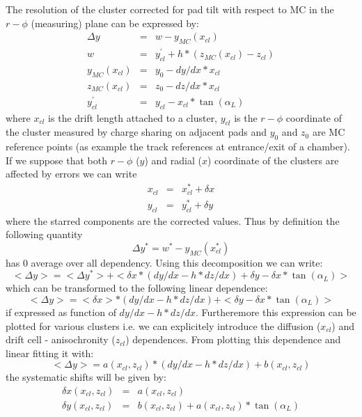 \documentclass{alicetdr}
\begin{document}
The resolution of the cluster corrected for pad tilt with respect to MC in the 
$r-\phi$ (measuring) plane can be expressed by:
\begin{eqnarray}
\Delta y&=&w - y_{MC}(x_{cl})\\
w &=& y_{cl}^{'} + h*(z_{MC}(x_{cl})-z_{cl})\\
y_{MC}(x_{cl}) &=& y_{0} - dy/dx*x_{cl}\\
z_{MC}(x_{cl}) &=& z_{0} - dz/dx*x_{cl}\\
y_{cl}^{'} &=& y_{cl}-x_{cl}*\tan(\alpha_{L})
\end{eqnarray}
where $x_{cl}$ is the drift length attached to a cluster, $y_{cl}$ is the 
$r-\phi$ coordinate of the cluster measured by charge sharing on adjacent pads 
and $y_0$ and $z_0$ are MC reference points (as example the track references at 
entrance/exit of a chamber). If we suppose that both $r-\phi$ ($y$) and radial 
($x$) coordinate of the clusters are affected by errors we can write
\begin{eqnarray}
x_{cl} &=& x_{cl}^{*} + \delta x\\ 
y_{cl} &=& y_{cl}^{*} + \delta y 
\end{eqnarray} 
where the starred components are the corrected values. Thus by definition the 
following quantity
\begin{equation}
\Delta y^{*}= w^{*} - y_{MC}(x_{cl}^{*})
\end{equation}
has 0 average over all dependency. Using this decomposition we can write:
\begin{equation}\label{EQ_CLUSTER:shift}
<\Delta y>=<\Delta y^{*}> + <\delta x * (dy/dx-h*dz/dx) + \delta y - \delta x 
          * \tan(\alpha_{L})>
\end{equation}
which can be transformed to the following linear dependence:
\begin{equation}
<\Delta y>= <\delta x> * (dy/dx-h*dz/dx) + <\delta y - \delta x * \tan(\alpha_{L})>
\end{equation}
if expressed as function of $dy/dx-h*dz/dx$. Furtheremore this expression can 
be plotted for various clusters i.e. we can explicitely introduce the diffusion 
($x_{cl}$) and drift cell - anisochronity ($z_{cl}$) dependences. From 
plotting this dependence and linear fitting it with:
\begin{equation}
<\Delta y>= a(x_{cl}, z_{cl}) * (dy/dx-h*dz/dx) + b(x_{cl}, z_{cl})
\end{equation}
the systematic shifts will be given by:
\begin{eqnarray}
\delta x (x_{cl}, z_{cl}) &=& a(x_{cl}, z_{cl})\\
\delta y (x_{cl}, z_{cl}) &=& b(x_{cl}, z_{cl}) + a(x_{cl}, z_{cl}) * \tan(\alpha_{L})
\end{eqnarray}
\end{document}
